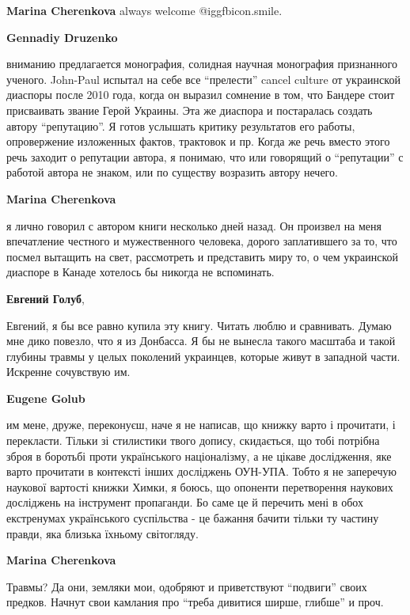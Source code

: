 \begin{itemize}
\begin{itemize}
\textbf{Marina Cherenkova} always welcome  @igg{fbicon.smile}.

\textbf{Gennadiy Druzenko} 

вниманию предлагается монография, солидная научная монография признанного
ученого. John-Paul испытал на себе все \enquote{прелести} cancel culture от украинской
диаспоры после 2010 года, когда он выразил сомнение в том, что Бандере стоит
присваивать звание Герой Украины. Эта же диаспора и постаралась создать автору
\enquote{репутацию}. Я готов услышать критику результатов его работы, опровержение
изложенных фактов, трактовок и пр. Когда же речь вместо этого речь заходит о
репутации автора, я понимаю, что или говорящий о \enquote{репутации} с работой автора
не знаком, или по существу возразить автору нечего.

\textbf{Marina Cherenkova} 

я лично говорил с автором книги несколько дней назад. Он произвел на меня
впечатление честного и мужественного человека, дорого заплатившего за то, что
посмел вытащить на свет, рассмотреть и представить миру то, о чем украинской
диаспоре в Канаде хотелось бы никогда не вспоминать.


\textbf{Евгений Голуб},

Евгений, я бы все равно купила эту книгу. Читать люблю и сравнивать. Думаю мне
дико повезло, что я из Донбасса. Я бы не вынесла такого масштаба и такой
глубины травмы у целых поколений украинцев, которые живут в западной части.
Искренне сочувствую им.

\textbf{Eugene Golub} 

им мене, друже, переконуєш, наче я не написав, що книжку варто і прочитати, і
перекласти. Тільки зі стилистики твого допису, скидається, що тобі потрібна
зброя в боротьбі проти українського націоналізму, а не цікаве дослідження, яке
варто прочитати в контексті інших досліджень ОУН-УПА. Тобто я не заперечую
наукової вартості книжки Химки, я боюсь, що опоненти перетворення наукових
досліджень на інструмент пропаганди. Бо саме це й перечить мені в обох
екстренумах українського суспільства - це бажання бачити тільки ту частину
правди, яка близька їхньому світогляду.

\textbf{Marina Cherenkova} 

Травмы? Да они, земляки мои, одобряют и приветствуют \enquote{подвиги} своих предков.
Начнут свои камлания про \enquote{треба дивитися ширше, глибше} и проч.


\end{itemize}
\end{itemize}
